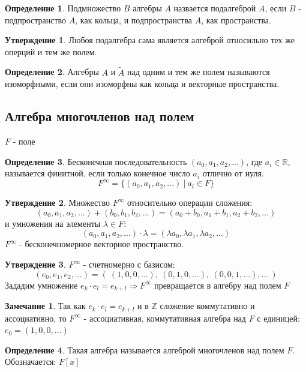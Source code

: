 \documentclass[a4paper, 12pt]{article}
\newcommand{\R}{\mathbb R}
\newcommand{\Z}{\mathbb Z}
\theoremstyle{definition}
\newtheorem*{definition}{Определение}
\newtheorem*{subtheorem}{Утверждение}
\newtheorem*{remark}{Замечание}
\begin{document}
  \begin{definition}
    Подмножество $B$ алгебры $A$ назвается подалгеброй $A$, если $B$ - подпространство $A$, как кольца, и подпространства $A$, как пространства.      
  \end{definition} 
  \begin{subtheorem}
    Любоя подалгебра сама является алгеброй относильно тех же оперций и тем же полем.
  \end{subtheorem} 
  \begin{definition}
    Алгебры $A$ и $\widetilde{A}$ над одним и тем же полем называются изоморфными, если они изоморфны как кольца и векторные пространства.
  \end{definition}

  \subsection{Алгебра многочленов над полем}
  $F$ - поле
  \begin{definition}
    Бесконечная последовательность $(a_0,a_1, a_2,...)$, где $a_i \in \R$, называется финитной, если только конечное число $a_i$ отлично от нуля. 
    $$F^{\infty} = \{(a_0,a_1, a_2,...) \ |\ a_i \in F \}$$ 
  \end{definition}  
  \begin{subtheorem}
    Множество $F^{\infty}$ относительно операции сложения: $$(a_0,a_1, a_2,...) + (b_0,b_1, b_2,...) = (a_0+b_0,a_1+b_1, a_2+b_2,...)$$ и умножения на элементы $\lambda \in F$: $$(a_0,a_1, a_2,...) \cdot \lambda = (\lambda a_0,\lambda a_1, \lambda a_2,...)$$
    $F^{\infty}$ - бесконечномерное векторное пространство.   
  \end{subtheorem} 
  \begin{subtheorem}
    $F^{\infty}$ - счетномерно с базисом:
    $$(e_0,e_1,e_2,...) = ( \ (1, 0, 0, ...), \ (0, 1, 0, ...), \ (0, 0, 1, ...), ... \ )$$ 
    Зададим умножение $e_k \cdot e_l = e_{k+l} \Longrightarrow F^{\infty}$  превращается в алгебру над полем $F$ 
  \end{subtheorem} 
  \begin{remark}
    Так как $e_k \cdot e_l = e_{k+l}$ и в $\Z$ сложение коммутативно и ассоциативно, то $F^{\infty}$ - ассоциативная, коммутативная алгебра над $F$ с единицей: $e_0 = (1, 0, 0, ...)$
  \end{remark} 
  \begin{definition}
    Такая алгебра называется алгеброй многочленов над полем $F$. 
    Обозначается: $F[x]$  
  \end{definition} 
\end{document}
